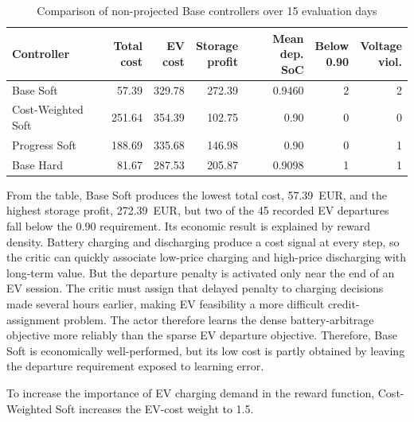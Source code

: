 \begin{table}[htbp]
  \centering
  \renewcommand{\arraystretch}{1.15}
  \caption{Comparison of non-projected Base controllers over 15 evaluation days}
  \label{tab:ch6-ev-ablation}
  \setlength{\tabcolsep}{2.5pt}
  \begin{tabular}{p{3.6cm}rrrrrr}
    \hline
    Controller & \shortstack{Total\\cost} & \shortstack{EV\\cost} & \shortstack{Storage\\profit} & \shortstack{Mean dep.\\SoC} & \shortstack{Below\\0.90} & \shortstack{Voltage\\viol.} \\
    \hline
    Base Soft & 57.39 & 329.78 & 272.39 & 0.9460 & 2 & 2 \\
    Cost-Weighted Soft & 251.64 & 354.39 & 102.75 & 0.90 & 0 & 0 \\
    Progress Soft & 188.69 & 335.68 & 146.98 & 0.90 & 0 & 1 \\
    Base Hard & 81.67 & 287.53 & 205.87 & 0.9098 & 1 & 1 \\
    \hline
  \end{tabular}
\end{table}

From the table, Base Soft produces the lowest total cost, 57.39~EUR, and the highest storage profit, 272.39~EUR, but two of the 45 recorded EV departures fall below the 0.90 requirement. Its economic result is explained by reward density. Battery charging and discharging produce a cost signal at every step, so the critic can quickly associate low-price charging and high-price discharging with long-term value. But the departure penalty is activated only near the end of an EV session. The critic must assign that delayed penalty to charging decisions made several hours earlier, making EV feasibility a more difficult credit-assignment problem. The actor therefore learns the dense battery-arbitrage objective more reliably than the sparse EV departure objective. Therefore, Base Soft is economically well-performed, but its low cost is partly obtained by leaving the departure requirement exposed to learning error.

To increase the importance of EV charging demand in the reward function, Cost-Weighted Soft increases the EV-cost weight to 1.5. 

